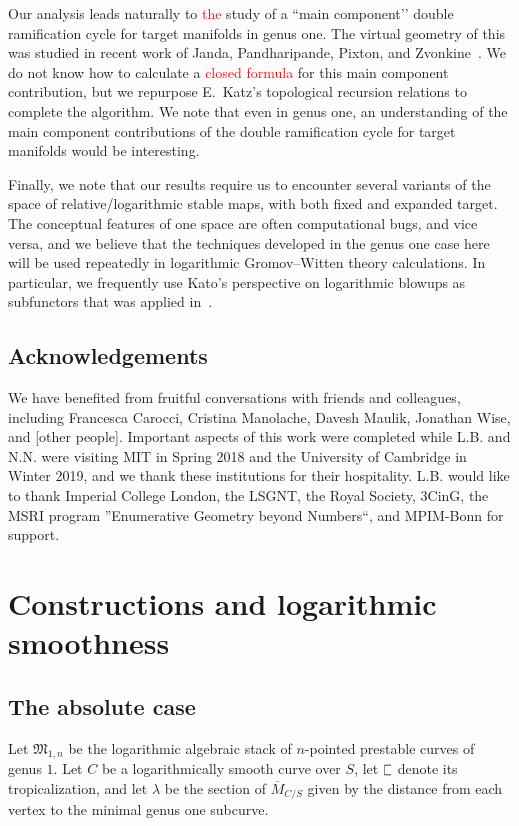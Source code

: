 \documentclass[11pt]{amsart}
\newcommand{\plC}{\scalebox{0.8}[1.3]{$\sqsubset$}}
\newcommand{\tred}{\textcolor{red}}
\theoremstyle{definition}
\theoremstyle{definition}
\begin{document}
Our analysis leads naturally to \tred{the} study of a ``main component’’ double ramification cycle for target manifolds in genus one. The virtual geometry of this was studied in recent work of Janda, Pandharipande, Pixton, and Zvonkine~\cite{DRCBundle}. We do not know how to calculate a \tred{closed formula} for this main component contribution, but we repurpose E.~Katz's topological recursion relations \cite{EKatz} to complete the algorithm. We note that even in genus one, an understanding of the main component contributions of the double ramification cycle for target manifolds would be interesting.

Finally, we note that our results require us to encounter several variants of the space of relative/logarithmic stable maps, with both fixed and expanded target. The conceptual features of one space are often computational bugs, and vice versa, and we believe that the techniques developed in the genus one case here will be used repeatedly in logarithmic Gromov--Witten theory calculations. In particular, we frequently use Kato's perspective on logarithmic blowups as subfunctors that was applied in~\cite{RSPW,RSPW2}.

\subsection*{Acknowledgements} We have benefited from fruitful conversations with friends and colleagues, including Francesca Carocci, Cristina Manolache, Davesh Maulik, Jonathan Wise, and [other people]. Important aspects of this work were completed while L.B. and N.N. were visiting MIT in Spring 2018 and the University of Cambridge in Winter 2019, and we thank these institutions for their hospitality. L.B. would like to thank Imperial College London, the LSGNT, the Royal Society, 3CinG, the MSRI program ''Enumerative Geometry beyond Numbers``, and MPIM-Bonn for support.


\newpage


\section{Constructions and logarithmic smoothness}\label{section construction}

\subsection{The absolute case} Let $\mathfrak M_{1,n}$ be the logarithmic algebraic stack of $n$-pointed prestable curves of genus $1$. Let $C$ be a logarithmically smooth curve over $S$, let $\plC$ denote its tropicalization, and let $\lambda$ be the section of $\overline{M}_{C/S}$ given by the distance from each vertex to the minimal genus one subcurve.
\end{document}

